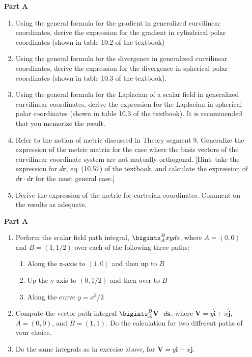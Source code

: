 \documentclass[fleqn]{article}
\begin{document}
  \textbf{Part A}
  \begin{enumerate}
    \item  Using the general formula for the gradient in generalized curvilinear coordinates, derive the expression for the gradient in cylindrical polar coordinates (shown in table 10.2 of the textbook)


    \item  Using the general formula for the divergence in generalized curvilinear coordinates, derive the expression for the divergence in spherical polar coordinates (shown in table 10.3 of the textbook).


    \item  Using the general formula for the Laplacian of a scalar field in generalized curvilinear coordinates, derive the expression for the Laplacian in spherical polar coordinates (shown in table 10.3 of the textbook). It is recommended that you memorize the result. 


    \item Refer to the notion of metric discussed in Theory segment 9.  Generalize the expression of the metric matrix for the case where the basis vectors of the curvilinear coordinate system are not mutually orthogonal.  [Hint: take the expression for  $d\mathbf{r}$, eq. (10.57) of the textbook, and calculate the expression of $d\mathbf{r} \cdot d\mathbf{r}$ for the most general case.]


    \item Derive the expression of the metric for cartesian coordinates. Comment on the results as adequate.
    
  \end{enumerate}


  \textbf{Part A}
  \begin{enumerate}
    \item  Perform the scalar field path integral, $\bigints_A^B xy ds$, where $A=(0,0)$ and $B=(1,1/2)$ over each of the following three paths:
      \begin{enumerate}
      \item Along the x-axis to $(1, 0)$ and then up to $B$
      \item Up the y-axis to $(0, 1/2)$ and then over to $B$

      \item Along the curve $y = x^2/2$ 
      \end{enumerate}

    \item  Compute the vector path integral $\bigints_A^B \mathbf{V}\cdot d\mathbf{s}$, where $\mathbf{V}=y \mathbf{\hat i} + x \mathbf{\hat j}$, $A=(0,0)$, and $B=(1,1)$. Do the calculation for two different paths of your choice. 

    \item  Do the same integrals as in exercise above, for $\mathbf{V}=y \mathbf{\hat i} - x \mathbf{\hat j}$. 

  \end{enumerate}
\end{document}
